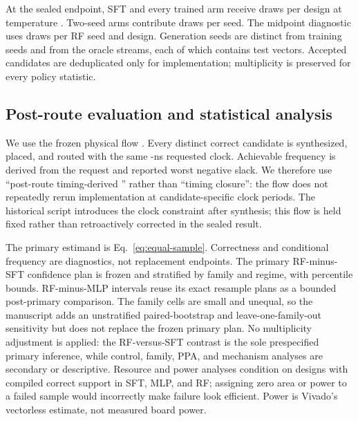 At the sealed endpoint, SFT and every trained arm receive
 draws per design at temperature
.  Two-seed arms contribute
 draws per seed.  The midpoint
diagnostic uses  draws per RF seed
and design.  Generation seeds are distinct from training seeds and from the
 oracle streams, each of which contains
 test vectors.  Accepted candidates are
deduplicated only for implementation; multiplicity is preserved for every
policy statistic.

\subsection{Post-route evaluation and statistical analysis}

We use the frozen physical flow . Every
distinct correct candidate is synthesized, placed, and routed with the same
-ns requested clock.  Achievable frequency is derived from
the request and reported worst negative slack.  We therefore use
``post-route timing-derived \fmax'' rather than ``timing closure'': the flow
does not repeatedly rerun implementation at candidate-specific clock periods.
The historical script introduces the clock constraint after synthesis; this
flow is held fixed rather than retroactively corrected in the sealed result.

The primary estimand is Eq.~\eqref{eq:equal-sample}.  Correctness and
conditional frequency are diagnostics, not replacement endpoints.  The
primary RF-minus-SFT confidence plan is frozen and stratified by family and
regime, with percentile bounds.  RF-minus-MLP intervals reuse its exact
resample plans as a bounded post-primary comparison.  The family cells are
small and unequal, so the manuscript adds an unstratified paired-bootstrap and
leave-one-family-out sensitivity but does not replace the frozen primary plan.
No multiplicity adjustment is applied: the RF-versus-SFT contrast is the sole
prespecified primary inference, while control, family, PPA, and mechanism
analyses are secondary or descriptive.  Resource and power analyses condition
on designs with compiled correct support in SFT, MLP, and RF; assigning zero
area or power to a failed sample would incorrectly make failure look efficient.
Power is Vivado's vectorless estimate, not measured board power.


